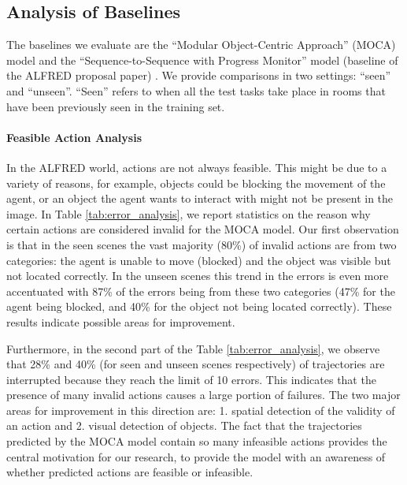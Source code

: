 \documentclass[11pt,a4paper]{article}
\begin{document}
\subsection{Analysis of Baselines}

The baselines we evaluate are the ``Modular Object-Centric Approach'' (MOCA) \citep{singh2020moca} model and the ``Sequence-to-Sequence with Progress Monitor'' model (baseline of the ALFRED proposal paper) \citep{ALFRED20}. We provide comparisons in two settings: ``seen'' and ``unseen''. ``Seen'' refers to when all the test tasks take place in rooms that have been previously seen in the training set.

\paragraph{Feasible Action Analysis} In the ALFRED world, actions are not always feasible. This might be due to a variety of reasons, for example, objects could be blocking the movement of the agent, or an object the agent wants to interact with might not be present in the image.   
In Table \ref{tab:error_analysis}, we report statistics on the reason why certain actions are considered invalid for the MOCA model. Our first observation is that in the seen scenes  the vast majority (80\%) of invalid actions are from two categories: the agent is unable to move (blocked) and the object was visible but not located correctly. In the unseen scenes this trend in the errors is even more accentuated with   87\% of the errors being from these two categories  (47\% for the agent being blocked, and 40\% for the object not being located correctly). These results indicate possible areas for improvement.

Furthermore, in the second part of the Table \ref{tab:error_analysis}, we observe that 28\% and 40\% (for seen and unseen scenes respectively) of trajectories are interrupted because they reach the limit of 10 errors. This indicates that the presence of many invalid actions causes a large portion of failures. The two major areas for improvement in this direction are: 1. spatial detection of the validity of an action and 2. visual detection of objects. The fact that the trajectories predicted by the MOCA model contain so many infeasible actions provides the central motivation for our research, to provide the model with an awareness of whether predicted actions are feasible or infeasible.
\end{document}
